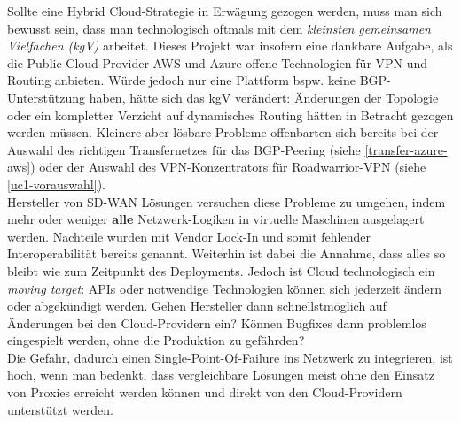 Sollte eine Hybrid Cloud-Strategie in Erwägung gezogen werden, muss man sich bewusst sein, dass man technologisch oftmals mit dem \textit{kleinsten gemeinsamen Vielfachen (kgV)} arbeitet. Dieses Projekt war insofern eine dankbare Aufgabe, als die Public Cloud-Provider AWS und Azure offene Technologien für VPN und Routing anbieten. Würde jedoch nur eine Plattform bspw. keine BGP-Unterstützung haben, hätte sich das kgV verändert: Änderungen der Topologie oder ein kompletter Verzicht auf dynamisches Routing hätten in Betracht gezogen werden müssen. Kleinere aber lösbare Probleme offenbarten sich bereits bei der Auswahl des richtigen Transfernetzes für das BGP-Peering (siehe \ref{transfer-azure-aws}) oder der Auswahl des VPN-Konzentrators für Roadwarrior-VPN (siehe \ref{uc1-vorauswahl}).\\
Hersteller von SD-WAN Lösungen versuchen diese Probleme zu umgehen, indem mehr oder weniger \textbf{alle} Netzwerk-Logiken in virtuelle Maschinen ausgelagert werden. Nachteile wurden mit Vendor Lock-In und somit fehlender Interoperabilität bereits genannt. Weiterhin ist dabei die Annahme, dass alles so bleibt wie zum Zeitpunkt des \gls{Deployments}. Jedoch ist Cloud technologisch ein \textit{moving target}: APIs oder notwendige Technologien können sich jederzeit ändern oder abgekündigt werden\cite{Yegge2020}. Gehen Hersteller dann schnellstmöglich auf Änderungen bei den Cloud-Providern ein? Können Bugfixes dann problemlos eingespielt werden, ohne die Produktion zu gefährden?\\ 
Die Gefahr, dadurch einen Single-Point-Of-Failure ins Netzwerk zu integrieren, ist hoch, wenn man bedenkt, dass vergleichbare Lösungen meist ohne den Einsatz von \glqq Proxies\grqq{} erreicht werden können und direkt von den Cloud-Providern unterstützt werden.


%



%
%

